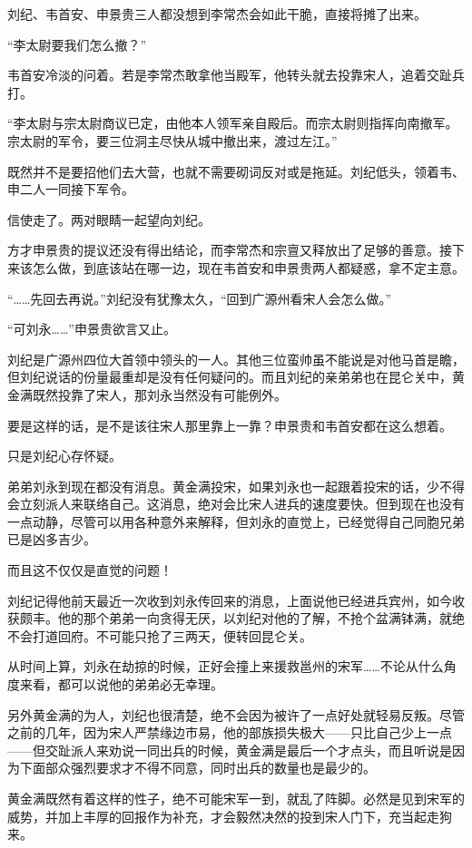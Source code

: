 刘纪、韦首安、申景贵三人都没想到李常杰会如此干脆，直接将摊了出来。

“李太尉要我们怎么撤？”

韦首安冷淡的问着。若是李常杰敢拿他当殿军，他转头就去投靠宋人，追着交趾兵打。

“李太尉与宗太尉商议已定，由他本人领军亲自殿后。而宗太尉则指挥向南撤军。宗太尉的军令，要三位洞主尽快从城中撤出来，渡过左江。”

既然并不是要招他们去大营，也就不需要砌词反对或是拖延。刘纪低头，领着韦、申二人一同接下军令。

信使走了。两对眼睛一起望向刘纪。

方才申景贵的提议还没有得出结论，而李常杰和宗亶又释放出了足够的善意。接下来该怎么做，到底该站在哪一边，现在韦首安和申景贵两人都疑惑，拿不定主意。

“……先回去再说。”刘纪没有犹豫太久，“回到广源州看宋人会怎么做。”

“可刘永……”申景贵欲言又止。

刘纪是广源州四位大首领中领头的一人。其他三位蛮帅虽不能说是对他马首是瞻，但刘纪说话的份量最重却是没有任何疑问的。而且刘纪的亲弟弟也在昆仑关中，黄金满既然投靠了宋人，那刘永当然没有可能例外。

要是这样的话，是不是该往宋人那里靠上一靠？申景贵和韦首安都在这么想着。

只是刘纪心存怀疑。

弟弟刘永到现在都没有消息。黄金满投宋，如果刘永也一起跟着投宋的话，少不得会立刻派人来联络自己。这消息，绝对会比宋人进兵的速度要快。但到现在也没有一点动静，尽管可以用各种意外来解释，但刘永的直觉上，已经觉得自己同胞兄弟已是凶多吉少。

而且这不仅仅是直觉的问题！

刘纪记得他前天最近一次收到刘永传回来的消息，上面说他已经进兵宾州，如今收获颇丰。他的那个弟弟一向贪得无厌，以刘纪对他的了解，不抢个盆满钵满，就绝不会打道回府。不可能只抢了三两天，便转回昆仑关。

从时间上算，刘永在劫掠的时候，正好会撞上来援救邕州的宋军……不论从什么角度来看，都可以说他的弟弟必无幸理。

另外黄金满的为人，刘纪也很清楚，绝不会因为被许了一点好处就轻易反叛。尽管之前的几年，因为宋人严禁缘边市易，他的部族损失极大——只比自己少上一点——但交趾派人来劝说一同出兵的时候，黄金满是最后一个才点头，而且听说是因为下面部众强烈要求才不得不同意，同时出兵的数量也是最少的。

黄金满既然有着这样的性子，绝不可能宋军一到，就乱了阵脚。必然是见到宋军的威势，并加上丰厚的回报作为补充，才会毅然决然的投到宋人门下，充当起走狗来。


